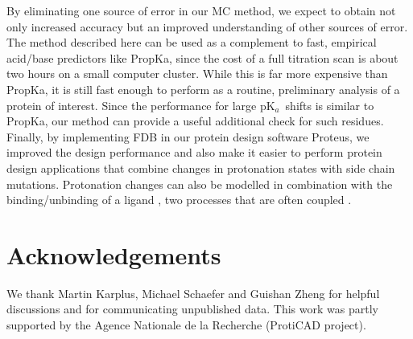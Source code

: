 \documentclass[a4paper,12pt]{article}
\newcommand{\pk}{pK$_a$}
\begin{document}
By eliminating one source of error in our MC method, we expect to obtain not only increased accuracy but an improved
understanding of other sources of error. The method described here can be used as a complement to fast, empirical acid/base
predictors like PropKa, since the cost of a full titration scan is about two hours on a small computer cluster. While this is
far more expensive than PropKa, it is still fast enough to perform as a routine, preliminary analysis of a protein of interest.
Since the performance for large \pk\ shifts is similar to PropKa, our method can provide a useful additional check for such
residues. Finally, by implementing FDB in our protein design software Proteus, we improved the design performance and also
make it easier to perform protein design applications that combine changes in protonation states with side chain mutations.
Protonation changes can also be modelled in combination with the binding/unbinding of a ligand \cite{Druart16}, two processes
that are often coupled \cite{Onufriev13}. 

\section*{Acknowledgements}
We thank Martin Karplus, Michael Schaefer and Guishan Zheng for helpful discussions and for communicating unpublished data.
This work was partly supported by the Agence Nationale de la Recherche (ProtiCAD project).

\small 

%
\normalsize
\clearpage

\end{document}
